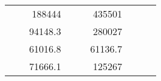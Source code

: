 \begin{table}[H]
\begin{tabular}{|ccrccrccc}
\multicolumn{1}{|c|}{\cellcolor[HTML]{FFFFC7}}                                & \multicolumn{1}{c|}{\cellcolor[HTML]{DDFDFF}}                      & \multicolumn{1}{r|}{\cellcolor[HTML]{DAE8FC}188444}    & \multicolumn{1}{c|}{\cellcolor[HTML]{FFFFC7}}                                & \multicolumn{1}{c|}{\cellcolor[HTML]{DDFDFF}}                       & \multicolumn{1}{r|}{\cellcolor[HTML]{DDFDFF}435501}    &                                                                              &                                                                    &                                                        \\ \cline{3-3} \cline{6-6}
\multicolumn{1}{|c|}{\cellcolor[HTML]{FFFFC7}}                                & \multicolumn{1}{c|}{\cellcolor[HTML]{DDFDFF}}                      & \multicolumn{1}{r|}{\cellcolor[HTML]{DDFDFF}94148.3}   & \multicolumn{1}{c|}{\cellcolor[HTML]{FFFFC7}}                                & \multicolumn{1}{c|}{\cellcolor[HTML]{DDFDFF}}                       & \multicolumn{1}{r|}{\cellcolor[HTML]{DAE8FC}280027}    &                                                                              &                                                                    &                                                        \\ \cline{3-3} \cline{6-6}
\multicolumn{1}{|c|}{\cellcolor[HTML]{FFFFC7}}                                & \multicolumn{1}{c|}{\cellcolor[HTML]{DDFDFF}}                      & \multicolumn{1}{r|}{\cellcolor[HTML]{DAE8FC}61016.8}   & \multicolumn{1}{c|}{\cellcolor[HTML]{FFFFC7}}                                & \multicolumn{1}{c|}{\cellcolor[HTML]{DDFDFF}}                       & \multicolumn{1}{r|}{\cellcolor[HTML]{DDFDFF}61136.7}   &                                                                              &                                                                    &                                                        \\ \cline{3-3} \cline{6-6}
\multicolumn{1}{|c|}{\cellcolor[HTML]{FFFFC7}}                                & \multicolumn{1}{c|}{\cellcolor[HTML]{DDFDFF}}                      & \multicolumn{1}{r|}{\cellcolor[HTML]{DDFDFF}71666.1}   & \multicolumn{1}{c|}{\cellcolor[HTML]{FFFFC7}}                                & \multicolumn{1}{c|}{\cellcolor[HTML]{DDFDFF}}                       & \multicolumn{1}{r|}{\cellcolor[HTML]{DAE8FC}125267}    &                                                                              &                                                                    &                                                        \\ \cline{3-3} \cline{6-6}

\end{tabular}
\end{table}
